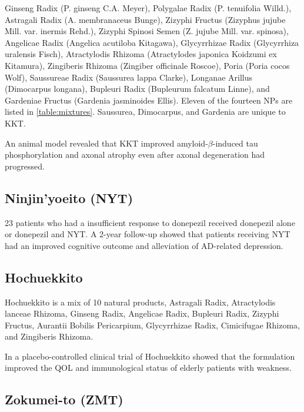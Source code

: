 \documentclass[twocolumn]{article}
\begin{document}
Ginseng Radix (P. ginseng C.A. Meyer),
Polygalae Radix (P. tenuifolia Willd.),
Astragali Radix (A. membranaceus Bunge),
Zizyphi Fructus (Zizyphus jujube Mill. var. inermis Rehd.),
Zizyphi Spinosi Semen (Z. jujube Mill. var. spinosa),
Angelicae Radix (Angelica acutiloba Kitagawa),
Glycyrrhizae Radix (Glycyrrhiza uralensis Fisch),
Atractylodis Rhizoma (Atractylodes japonica Koidzumi ex Kitamura),
Zingiberis Rhizoma (Zingiber officinale Roscoe),
Poria (Poria cocos Wolf),
Saussureae Radix (Saussurea lappa Clarke),
Longanae Arillus (Dimocarpus longana),
Bupleuri Radix (Bupleurum falcatum Linne), and
Gardeniae Fructus (Gardenia jasminoides Ellis).
Eleven of the fourteen NPs are listed in \ref{table:mixtures}.
Saussurea, Dimocarpus, and Gardenia are unique to KKT.

An animal model revealed that KKT
improved amyloid-$\beta$-induced tau phosphorylation and axonal atrophy
even after axonal degeneration had progressed.
\cite{watari2014new, watari2015comparing}




\subsection{Ninjin'yoeito (NYT)}


23 patients who had a insufficient response to donepezil
received donepezil alone or donepezil and NYT.
A 2-year follow-up showed that patients receiving NYT
had an improved cognitive outcome and alleviation of AD-related depression.
\cite{kudoh2015effect}





\subsection{Hochuekkito}
Hochuekkito is a mix of 10 natural products,
Astragali Radix,
Atractylodis lanceae Rhizoma,
Ginseng Radix,
Angelicae Radix,
Bupleuri Radix,
Zizyphi Fructus,
Aurantii Bobilis Pericarpium,
Glycyrrhizae Radix,
Cimicifugae Rhizoma,
and Zingiberis Rhizoma.
\cite{kiyohara2011polysaccharide}

In a placebo-controlled clinical trial of Hochuekkito
showed that the formulation improved the QOL and immunological status
of elderly patients with weakness.
\cite{satoh2005randomized}

\subsection{Zokumei-to (ZMT)}
\end{document}

